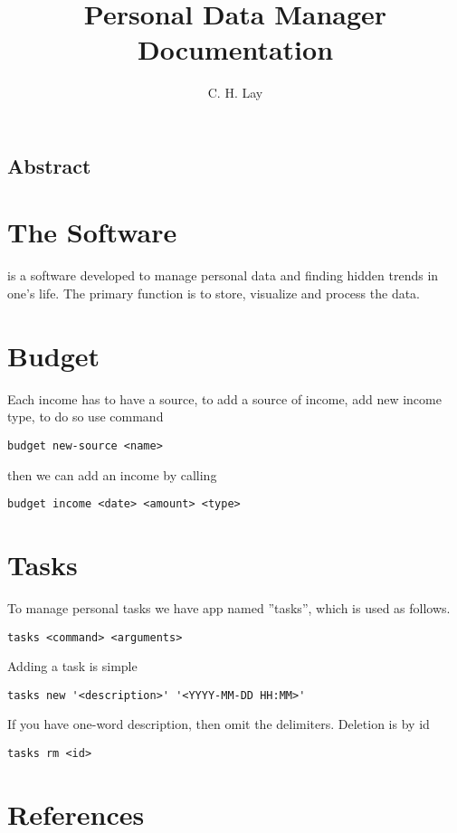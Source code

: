 \documentclass{article}
\title{Personal Data Manager\\ \Large{Documentation}}
\author{C. H. Lay}
\begin{document}
\maketitle
\tableofcontents

\subsection*{Abstract}


\section{The Software}
 is a software developed to manage personal data and finding hidden trends in one's life. The primary function is to store, visualize and process the data.

\section{Budget}
Each income has to have a source, to add a source of income, add new income type, to do so use command
\begin{lstlisting}
budget new-source <name>
\end{lstlisting}
then we can add an income by calling
\begin{lstlisting}
budget income <date> <amount> <type>
\end{lstlisting}

\section{Tasks}
To manage personal tasks we have app named ''tasks'', which is used as follows.
\begin{lstlisting}
tasks <command> <arguments>
\end{lstlisting}
Adding a task is simple
\begin{lstlisting}
tasks new '<description>' '<YYYY-MM-DD HH:MM>'
\end{lstlisting}
If you have one-word description, then omit the delimiters.
Deletion is by id
\begin{lstlisting}
tasks rm <id>
\end{lstlisting}
\section{References}
\end{document}
